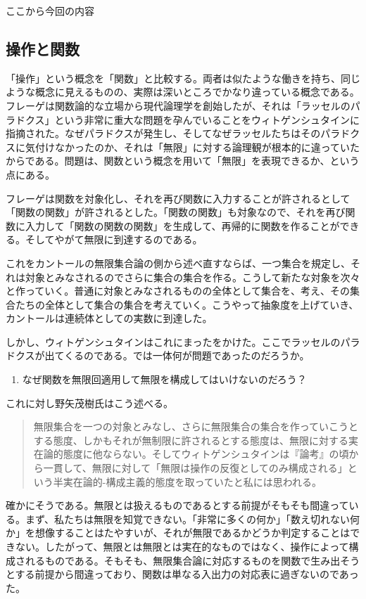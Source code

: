 \documentclass[a4paper,onecolumn,article]{jarticle}
\newcounter{ct}               %
\begin{document}
{\small{ここから今回の内容}}

\subsection{操作と関数}

「操作」という概念を「関数」と比較する。両者は似たような働きを持ち、同じような概念に見えるものの、実際は深いところでかなり違っている概念である。フレーゲは関数論的な立場から現代論理学を創始したが、それは「ラッセルのパラドクス」という非常に重大な問題を孕んでいることをウィトゲンシュタインに指摘された。なぜパラドクスが発生し、そしてなぜラッセルたちはそのパラドクスに気付けなかったのか、それは「無限」に対する論理観が根本的に違っていたからである。問題は、関数という概念を用いて「無限」を表現できるか、という点にある。

フレーゲは関数を対象化し、それを再び関数に入力することが許されるとして「関数の関数」が許されるとした。「関数の関数」も対象なので、それを再び関数に入力して「関数の関数の関数」を生成して、再帰的に関数を作ることができる。そしてやがて無限に到達するのである。

これをカントールの無限集合論の側から述べ直すならば、一つ集合を規定し、それは対象とみなされるのでさらに集合の集合を作る。こうして新たな対象を次々と作っていく。普通に対象とみなされるものの全体として集合を、考え、その集合たちの全体として集合の集合を考えていく。こうやって抽象度を上げていき、カントールは連続体としての実数に到達した。

しかし、ウィトゲンシュタインはこれにまったをかけた。ここでラッセルのパラドクスが出てくるのである。では一体何が問題であったのだろうか。
{\bf
\begin{enumerate}
  \item なぜ関数を無限回適用して無限を構成してはいけないのだろう？
\end{enumerate}}
これに対し野矢茂樹氏はこう述べる。
{\bf
\begin{quotation}
   無限集合を一つの対象とみなし、さらに無限集合の集合を作っていこうとする態度、しかもそれが無制限に許されるとする態度は、無限に対する実在論的態度に他ならない。そしてウィトゲンシュタインは『論考』の頃から一貫して、無限に対して「無限は操作の反復としてのみ構成される」という半実在論的-構成主義的態度を取っていたと私には思われる。
\end{quotation}}

確かにそうである。無限とは扱えるものであるとする前提がそもそも間違っている。まず、私たちは無限を知覚できない。「非常に多くの何か」「数え切れない何か」を想像することはたやすいが、それが無限であるかどうか判定することはできない。したがって、無限とは無限とは実在的なものではなく、操作によって構成されるものである。そもそも、無限集合論に対応するものを関数で生み出そうとする前提から間違っており、関数は単なる入出力の対応表に過ぎないのであった。
\end{document}
